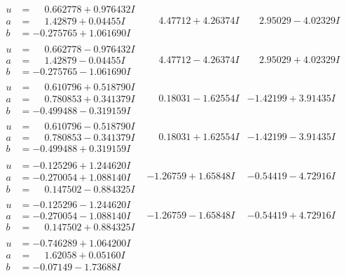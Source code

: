\documentclass[1p]{elsarticle_modified}
\theoremstyle{definition}
\begin{document}
$$\begin{array}{c|c|c}
\begin{aligned}
u &= \phantom{-}0.662778 + 0.976432 I \\
a &= \phantom{-}1.42879 + 0.04455 I \\
b &= -0.275765 + 1.061690 I\end{aligned}
 & \phantom{-}4.47712 + 4.26374 I & \phantom{-}2.95029 - 4.02329 I \\ \hline\begin{aligned}
u &= \phantom{-}0.662778 - 0.976432 I \\
a &= \phantom{-}1.42879 - 0.04455 I \\
b &= -0.275765 - 1.061690 I\end{aligned}
 & \phantom{-}4.47712 - 4.26374 I & \phantom{-}2.95029 + 4.02329 I \\ \hline\begin{aligned}
u &= \phantom{-}0.610796 + 0.518790 I \\
a &= \phantom{-}0.780853 + 0.341379 I \\
b &= -0.499488 - 0.319159 I\end{aligned}
 & \phantom{-}0.18031 - 1.62554 I & -1.42199 + 3.91435 I \\ \hline\begin{aligned}
u &= \phantom{-}0.610796 - 0.518790 I \\
a &= \phantom{-}0.780853 - 0.341379 I \\
b &= -0.499488 + 0.319159 I\end{aligned}
 & \phantom{-}0.18031 + 1.62554 I & -1.42199 - 3.91435 I \\ \hline\begin{aligned}
u &= -0.125296 + 1.244620 I \\
a &= -0.270054 + 1.088140 I \\
b &= \phantom{-}0.147502 - 0.884325 I\end{aligned}
 & -1.26759 + 1.65848 I & -0.54419 - 4.72916 I \\ \hline\begin{aligned}
u &= -0.125296 - 1.244620 I \\
a &= -0.270054 - 1.088140 I \\
b &= \phantom{-}0.147502 + 0.884325 I\end{aligned}
 & -1.26759 - 1.65848 I & -0.54419 + 4.72916 I \\ \hline\begin{aligned}
u &= -0.746289 + 1.064200 I \\
a &= \phantom{-}1.62058 + 0.05160 I \\
b &= -0.07149 - 1.73688 I\end{aligned}

\end{array}$$
\end{document}
